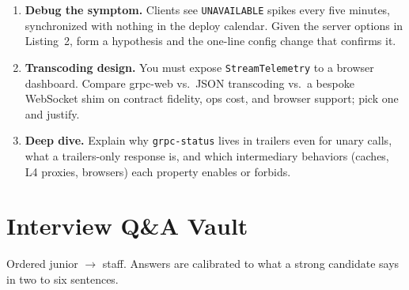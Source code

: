 \begin{enumerate}
        \texttt{RESOURCE\_EXHAUSTED} with a \texttt{RetryInfo}-style detail in
        a \texttt{-bin} trailer. Which of the four handler shapes need
        different treatment and why?
  \item \textbf{Debug the symptom.} Clients see \texttt{UNAVAILABLE} spikes
        every five minutes, synchronized with nothing in the deploy calendar.
        Given the server options in Listing~2, form a hypothesis and the
        one-line config change that confirms it.
  \item \textbf{Transcoding design.} You must expose \texttt{StreamTelemetry}
        to a browser dashboard. Compare grpc-web vs.\ JSON transcoding vs.\ a
        bespoke WebSocket shim on contract fidelity, ops cost, and browser
        support; pick one and justify.
  \item \textbf{Deep dive.} Explain why \texttt{grpc-status} lives in trailers
        even for unary calls, what a trailers-only response is, and which
        intermediary behaviors (caches, L4 proxies, browsers) each property
        enables or forbids.
\end{enumerate}
\section{Interview Q\&A Vault}
\label{sec:ch13-qa}

Ordered junior $\rightarrow$ staff. Answers are calibrated to what a strong
candidate says in two to six sentences.

